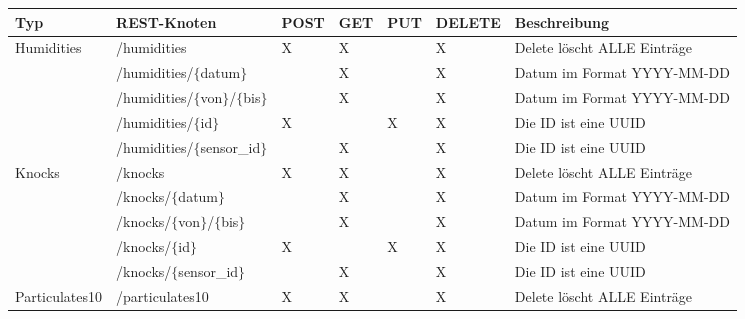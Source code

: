 \begin{landscape}
  \begin{table}[H]
    \begin{longtable}{lllllll}
      \textbf{Typ}                    & \textbf{REST-Knoten}                    & \textbf{POST} & \textbf{GET} & \textbf{PUT} & \textbf{DELETE} & \textbf{Beschreibung}   \\ \toprule
      \multirow{5}{*}{Humidities}     & /humidities                             & X & X &   & X & Delete löscht ALLE Einträge                                             \\
                                      & /humidities/$\{$datum$\}$               &   & X &   & X & Datum im Format YYYY-MM-DD                                              \\
                                      & /humidities/$\{$von$\}$/$\{$bis$\}$     &   & X &   & X & Datum im Format YYYY-MM-DD                                              \\
                                      & /humidities/$\{$id$\}$                  & X &   & X & X & Die ID ist eine UUID                                                    \\
                                      & /humidities/$\{$sensor\_id$\}$          &   & X &   & X & Die ID ist eine UUID                                                    \\ \midrule
      \multirow{5}{*}{Knocks}         & /knocks                                 & X & X &   & X & Delete löscht ALLE Einträge                                             \\
                                      & /knocks/$\{$datum$\}$                   &   & X &   & X & Datum im Format YYYY-MM-DD                                              \\
                                      & /knocks/$\{$von$\}$/$\{$bis$\}$         &   & X &   & X & Datum im Format YYYY-MM-DD                                              \\
                                      & /knocks/$\{$id$\}$                      & X &   & X & X & Die ID ist eine UUID                                                    \\
                                      & /knocks/$\{$sensor\_id$\}$              &   & X &   & X & Die ID ist eine UUID                                                    \\ \midrule
      \multirow{5}{*}{Particulates10} & /particulates10                         & X & X &   & X & Delete löscht ALLE Einträge                                             \\

\end{longtable}
\end{table}
\end{landscape}
